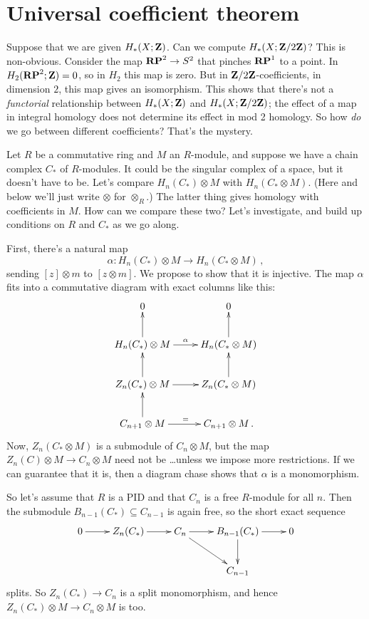 \section{Universal coefficient theorem}

Suppose that we are given $ H_\ast(X;\mathbf Z)$. Can we compute $ H_\ast(X;\mathbf Z/2\mathbf Z)$? 
This is non-obvious. Consider the map $\mathbf{RP}^2\to S^2$ that pinches $\mathbf{RP}^1$ to a point. In $H_2(\mathbf{RP}^2;\mathbf Z)=0$, so in $H_2$ this map is zero. But in $\mathbf Z/2\mathbf Z$-coefficients, in dimension $2$, this map gives an isomorphism. This shows that there's not a {\em functorial} relationship between $ H_\ast(X;\mathbf Z)$ and $ H_\ast(X;\mathbf Z/2\mathbf Z)$; the effect of a map in integral homology does not determine its effect in mod 2 homology. So how \emph{do} we go between different coefficients? That's the mystery.

Let $R$ be a commutative ring and $M$ an $R$-module, and suppose we have a chain complex $C_\ast$ of $R$-modules. It could be the singular complex of a space, but it doesn't have to be. Let's compare $ H_n(C_\ast)\otimes M$ with $ H_n(C_\ast\otimes M)$. (Here and below we'll just write $\otimes$ for $\otimes_R$.) The latter thing gives homology with coefficients in $M$. How can we compare these two? Let's investigate, and build up conditions on $R$ and $C_\ast$ as we go along. 

First, there's a natural map 
\[
\alpha: H_n(C_\ast)\otimes M\to H_n(C_\ast\otimes M)\,,
\]
sending $[z]\otimes m$ to $[z\otimes m]$. We propose to show that it is 
injective. The map $\alpha$ fits into a commutative 
diagram with exact columns like this:
\[
\xymatrix{
0 & 0 \\
H_n(C_*)\otimes M \ar[r]^\alpha \ar[u] & H_n(C_*\otimes M) \ar[u] \\
Z_n(C_*)\otimes M \ar[r] \ar[u] & Z_n(C_*\otimes M) \ar[u] \\
C_{n+1}\otimes M \ar[r]^= \ar[u] & C_{n+1}\otimes M\,.
}\]
Now, $Z_n(C_*\otimes M)$ is a submodule of $C_n\otimes M$, but the map
$Z_n(C)\otimes M\to C_n\otimes M$ need not be \ldots unless we impose more
restrictions. If we can guarantee that it is, then a diagram chase shows
that $\alpha$ is a monomorphism. 

So let's assume that $R$ is a PID and that $C_n$ is a free $R$-module for 
all $n$. Then the submodule $B_{n-1}(C_*)\subseteq C_{n-1}$ is again free, 
so the short exact sequence 
\[
\xymatrix{
0 \ar[r] & Z_n(C_*) \ar[r] & C_n \ar[r] \ar[dr] & 
B_{n-1}(C_*) \ar[r] \ar[d] & 0 \\
&&& C_{n-1} 
}\]
splits. So $Z_n(C_*)\to C_n$ is a split monomorphism, and hence 
$Z_n(C_*)\otimes M\to C_n\otimes M$ is too. 

